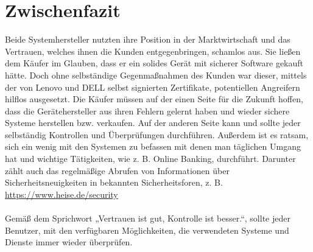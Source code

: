 \section{Zwischenfazit}
Beide Systemhersteller nutzten ihre Position in der Marktwirtschaft und das Vertrauen, welches ihnen die Kunden entgegenbringen, schamlos aus. Sie ließen dem Käufer im Glauben, dass er ein solides Gerät mit sicherer Software gekauft hätte. Doch ohne selbständige Gegenmaßnahmen des Kunden war dieser, mittels der von Lenovo und DELL selbst signierten Zertifikate, potentiellen Angreifern hilflos ausgesetzt. Die Käufer müssen auf der einen Seite für die Zukunft hoffen, dass die Gerätehersteller aus ihren Fehlern gelernt haben und wieder sichere Systeme herstellen bzw. verkaufen. Auf der anderen Seite kann und sollte jeder selbständig Kontrollen und Überprüfungen durchführen. Außerdem ist es ratsam, sich ein wenig mit den Systemen zu befassen mit denen man täglichen Umgang hat und wichtige Tätigkeiten, wie z. B. Online Banking, durchführt. Darunter zählt auch das regelmäßige Abrufen von Informationen über Sicherheitsneuigkeiten in bekannten Sicherheitsforen, z. B. \url{https://www.heise.de/security}
\\
\\
Gemäß dem Sprichwort „Vertrauen ist gut, Kontrolle ist besser.“, sollte jeder Benutzer, mit den verfügbaren Möglichkeiten, die verwendeten Systeme und Dienste immer wieder überprüfen.